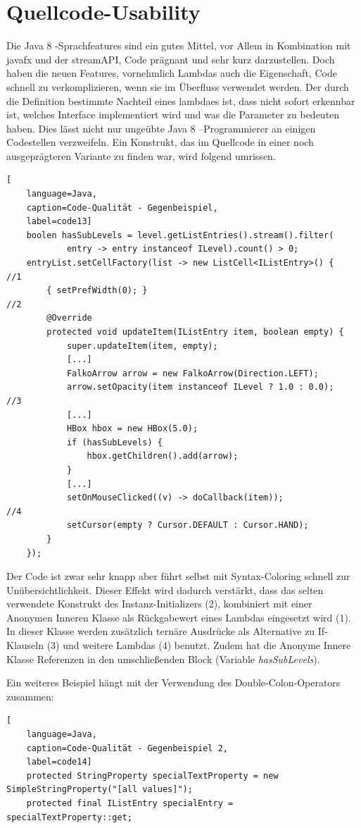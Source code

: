 \section{Quellcode-Usability} \label{sec:quellcodeUsability}
Die Java 8 -Sprachfeatures sind ein gutes Mittel, vor Allem in Kombination mit \gls{javafx} und der \gls{streamAPI}, Code prägnant und sehr kurz darzustellen. Doch haben die neuen Features, vornehmlich Lambdas auch die Eigenschaft, Code schnell zu verkomplizieren, wenn sie im Überfluss verwendet werden. Der durch die Definition bestimmte Nachteil eines \gls{lambda}es ist, dass nicht sofort erkennbar ist, welches Interface implementiert wird und was die Parameter zu bedeuten haben. Dies lässt nicht nur ungeübte Java 8 –Programmierer an einigen Codestellen verzweifeln. Ein Konstrukt, das im Quellcode in einer noch ausgeprägteren Variante zu finden war, wird folgend umrissen.

\begin{lstlisting}[
    language=Java,
    caption=Code-Qualität - Gegenbeispiel,
    label=code13]
	boolen hasSubLevels = level.getListEntries().stream().filter(
			entry -> entry instanceof ILevel).count() > 0;
	entryList.setCellFactory(list -> new ListCell<IListEntry>() { 		//1
		{ setPrefWidth(0); } 																//2
		@Override
		protected void updateItem(IListEntry item, boolean empty) {
			super.updateItem(item, empty);
			[...]
			FalkoArrow arrow = new FalkoArrow(Direction.LEFT);
			arrow.setOpacity(item instanceof ILevel ? 1.0 : 0.0); 			//3
			[...]
			HBox hbox = new HBox(5.0);
			if (hasSubLevels) {
				hbox.getChildren().add(arrow);
			}
			[...]
			setOnMouseClicked((v) -> doCallback(item)); 						//4
			setCursor(empty ? Cursor.DEFAULT : Cursor.HAND);
		}
	});
\end{lstlisting}

Der Code ist zwar sehr knapp aber führt selbst mit Syntax-Coloring schnell zur Unübersichtlichkeit. Dieser Effekt wird dadurch verstärkt, dass das selten verwendete Konstrukt des Instanz-Initializers (2), kombiniert mit einer Anonymen Inneren Klasse als Rückgabewert eines Lambdas eingesetzt wird (1). In dieser Klasse werden zusätzlich ternäre Ausdrücke als Alternative zu If-Klauseln (3) und weitere Lambdas (4) benutzt. Zudem hat die Anonyme Innere Klasse Referenzen in den umschließenden Block (Variable \textit{hasSubLevels}).

Ein weiteres Beispiel hängt mit der Verwendung des Double-Colon-Operators zusammen:

\begin{lstlisting}[
    language=Java,
    caption=Code-Qualität - Gegenbeispiel 2,
    label=code14]
	protected StringProperty specialTextProperty = new SimpleStringProperty("[all values]");
	protected final IListEntry specialEntry = specialTextProperty::get;
\end{lstlisting}

